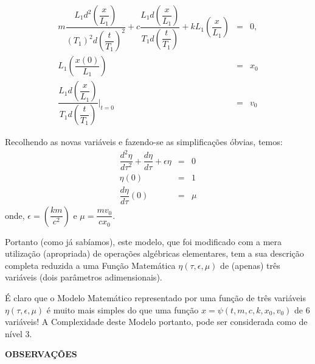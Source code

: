     {\tiny
    \[\begin{array}{rcl}
    m \dfrac{L_{1}d^2\left(\dfrac{x}{L_{1}}\right)}{(T_{1})^{2}d\left(\dfrac{t}{T_{1}}\right)^{2}} +
    c \dfrac{L_{1}d\left(\dfrac{x}{L_{1}}\right)}{T_{1}d\left(\dfrac{t}{T_{1}}\right)}
    +kL_{1} \left(\dfrac{x}{L_{1}} \right) &=& 0, \\
    L_{1} \left(\dfrac{x(0)}{L_{1}}\right) &=& x_{0} \\
    \dfrac{L_{1}d\left(\dfrac{x}{L_{1}}\right)}{T_{1}d\left(\dfrac{t}{T_{1}}\right)}\Bigg|_{t=0} &=& v_{0}
    \end{array}\]}

    Recolhendo as novas variáveis e fazendo-se as simplificações óbvias, temos:
    \[\begin{array}{rcl}
    \dfrac{d^2\eta}{d\tau^2} + \dfrac{d\eta}{d\tau} + \epsilon \eta &=& 0 \\
    \eta(0) &=& 1 \\
    \dfrac{d\eta}{d\tau}(0) &=& \mu
    \end{array}\]
    onde, \(\epsilon = \left(\dfrac{km}{c^2}\right)\) e \(\mu = \dfrac{mv_0}{cx_0}\).

    Portanto (como já sabíamos), este modelo, que foi modificado com a mera utilização (apropriada) de operações algébricas elementares, tem a sua descrição completa reduzida a uma Função Matemática \(\eta(\tau, \epsilon, \mu)\) de (apenas) três variáveis (dois parâmetros adimensionais).

    É claro que o Modelo Matemático representado por uma função de três variáveis \(\eta(\tau, \epsilon, \mu)\) é muito mais simples do que uma função \(x = \psi(t, m, c, k, x_0, v_0)\) de \(6\) variáveis! A Complexidade deste Modelo portanto, pode ser considerada como de nível \(3\).

\textbf{OBSERVAÇÕES}

